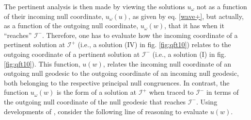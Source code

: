 \documentclass[
12pt,		%
openright,	%
twoside,  %
a4paper,			%
chapter=TITLE,		%
english,			%
french,				%
spanish,			%
brazil				%
]{USPSC-classe/USPSC}
\begin{document}
The pertinent analysis is then made by viewing the solutions $u_{\omega}$ not as a function of their incoming null coordinate, $u_{\omega}(u)$, as given by eq. \ref{wave+}, but actually, as a function of the outgoing null coordinate, $u_{\omega}(w)$, that it has when it ``reaches'' $\mathscr{I}^-$. Therefore, one has to evaluate how the incoming coordinate of a pertinent solution at $\mathscr{I}^+$ (i.e., a solution (IV) in fig. \ref{fig:qft10}) relates to the outgoing coordinate of a pertinent solution at $\mathscr{I}^-$ (i.e., a solution (I) in fig. \ref{fig:qft10}). This function, $u(w)$, relates the incoming null coordinate of an outgoing null geodesic to the outgoing coordinate of an incoming null geodesic, both belonging to the respective principal null congruences. In contrast, the function $u_{\omega}(w)$ is the form of a solution at $\mathscr{I}^+$ when traced to $\mathscr{I}^-$ in terms of the outgoing null coordinate of the null geodesic that reaches $\mathscr{I}^-$. Using developments of \cite{Parker2009}, consider the following line of reasoning to evaluate $u(w)$.
\end{document}
